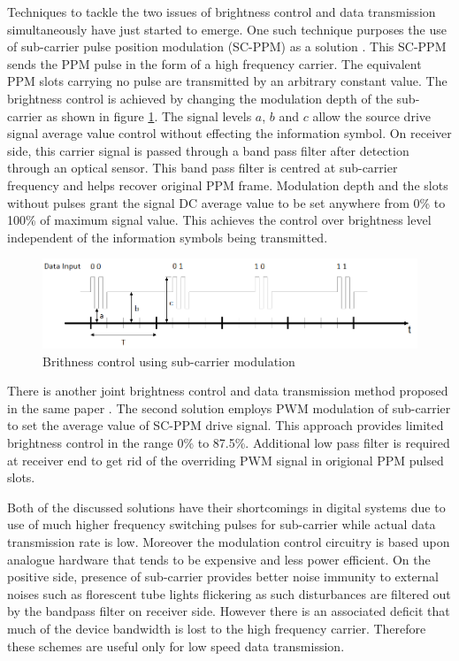 Techniques to tackle the two issues of brightness control and data transmission simultaneously have just started to emerge. One such technique  purposes the use of sub-carrier pulse position modulation (SC-PPM) as a solution \cite{sugiyama2007brightness}. This SC-PPM sends the PPM pulse in the form of a high frequency carrier. The equivalent PPM slots carrying no pulse are transmitted by an arbitrary constant value. The brightness control is achieved by changing the modulation depth of the sub-carrier as shown in figure \ref{fig:carrier_depth}. The signal levels $a$, $b$ and $c$ allow the source drive signal average value control without effecting the information symbol. On receiver side, this carrier signal is passed through a band pass filter after detection through an optical sensor. This band pass filter is centred at sub-carrier frequency and helps recover original PPM frame. Modulation depth and the slots without pulses grant the signal DC average value to be set anywhere from 0\% to 100\% of maximum signal value. This achieves the control over brightness level independent of the information symbols being transmitted.

\begin{figure}
	\includegraphics[width=\textwidth]{./Figures/slide0042_image022.png}
	\caption{Brithness control using sub-carrier modulation}
	\label{fig:carrier_depth}
\end{figure}

There is another joint brightness control and data transmission method proposed in the same paper \cite{sugiyama2007brightness}. The second solution employs PWM modulation of sub-carrier to set the average value of SC-PPM drive signal. This approach provides limited brightness control in the range 0\% to 87.5\%. Additional low pass filter is required at receiver end to get rid of the overriding PWM signal in origional PPM pulsed slots.

Both of the discussed solutions have their shortcomings in digital systems due to use of much higher frequency switching pulses for sub-carrier while actual data transmission rate is low. Moreover the modulation control circuitry is based upon analogue hardware that tends to be expensive and less power efficient. On the positive side, presence of sub-carrier provides better noise immunity to external noises such as florescent tube lights flickering as such disturbances are filtered out by the bandpass filter on receiver side.  However there is an associated deficit that much of the device bandwidth is lost to the high frequency carrier. Therefore these schemes are useful only for low speed data transmission.

